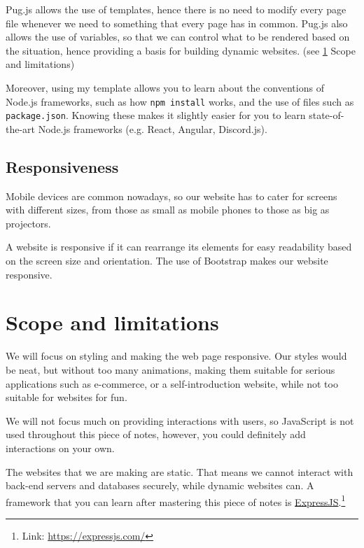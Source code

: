 Pug.js allows the use of templates, hence there is no need to modify every page file whenever we need to something that every page has in common. Pug.js also allows the use of variables, so that we can control what to be rendered based on the situation, hence providing a basis for building dynamic websites. (see \cref{sec:limitations} Scope and limitations)

Moreover, using my template allows you to learn about the conventions of Node.js frameworks, such as how \texttt{npm install} works, and the use of files such as \texttt{package.json}. Knowing these makes it slightly easier for you to learn state-of-the-art Node.js frameworks (e.g. React, Angular, Discord.js).

\subsection*{Responsiveness}

Mobile devices are common nowadays, so our website has to cater for screens with different sizes, from those as small as mobile phones to those as big as projectors. 

A website is responsive if it can rearrange its elements for easy readability based on the screen size and orientation. The use of Bootstrap makes our website responsive.
\vspace{6mm}


\section{Scope and limitations}
\label{sec:limitations}
We will focus on styling and making the web page responsive. Our styles would be neat, but without too many animations, making them suitable for serious applications such as e-commerce, or a self-introduction website, while not too suitable for websites for fun.

We will not focus much on providing interactions with users, so JavaScript is not used throughout this piece of notes, however, you could definitely add interactions on your own.

The websites that we are making are static. That means we cannot interact with back-end servers and databases securely, while dynamic websites can. A framework that you can learn after mastering this piece of notes is \href{https://expressjs.com/}{ExpressJS}.\footnote{Link: \url{https://expressjs.com/}}